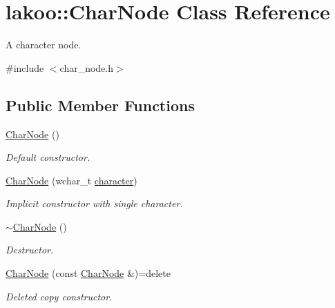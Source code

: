 \hypertarget{classlakoo_1_1_char_node}{}\section{lakoo\+:\+:Char\+Node Class Reference}
\label{classlakoo_1_1_char_node}


A character node.  




{\ttfamily \#include $<$char\+\_\+node.\+h$>$}

\subsection*{Public Member Functions}
\begin{DoxyCompactItemize}
\item 
\hyperlink{classlakoo_1_1_char_node_ab9fabb1a5e13efdddee7b59bf8a1e653}{Char\+Node} ()
\begin{DoxyCompactList}\small\item\em Default constructor. \end{DoxyCompactList}\item 
\hyperlink{classlakoo_1_1_char_node_adbe83f97e8225dd1c61f76ce421fc29e}{Char\+Node} (wchar\+\_\+t \hyperlink{classlakoo_1_1_char_node_ae84c27b0f90851d228cbb3b7c4243022}{character})
\begin{DoxyCompactList}\small\item\em Implicit constructor with single character. \end{DoxyCompactList}\item 
\mbox{\label{classlakoo_1_1_char_node_acc2a23fcb6cd5904e7a317e806a66bee}} 
\hyperlink{classlakoo_1_1_char_node_acc2a23fcb6cd5904e7a317e806a66bee}{$\sim$\+Char\+Node} ()
\begin{DoxyCompactList}\small\item\em Destructor. \end{DoxyCompactList}\item 
\mbox{\label{classlakoo_1_1_char_node_a9209b1ea5722f75ed1a173e24b2c4549}} 
\hyperlink{classlakoo_1_1_char_node_a9209b1ea5722f75ed1a173e24b2c4549}{Char\+Node} (const \hyperlink{classlakoo_1_1_char_node}{Char\+Node} \&)=delete
\begin{DoxyCompactList}\small\item\em Deleted copy constructor. \end{DoxyCompactList}\item 

\end{DoxyCompactItemize}
